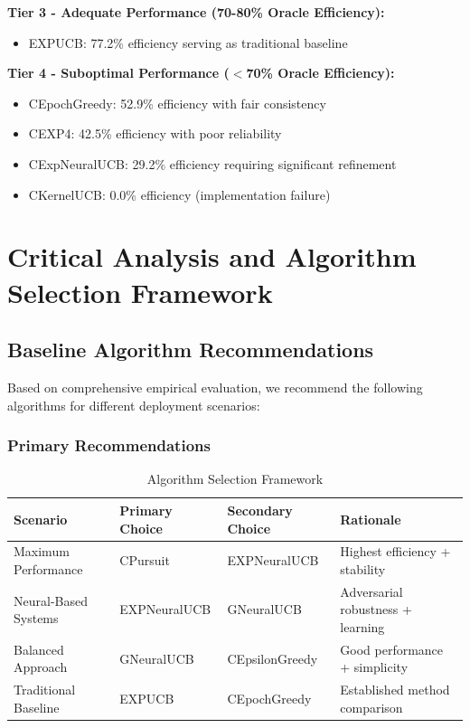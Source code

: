 \documentclass[12pt,a4paper]{article}
\begin{document}
\textbf{Tier 3 - Adequate Performance (70-80\% Oracle Efficiency):}
\begin{itemize}
\item EXPUCB: 77.2\% efficiency serving as traditional baseline
\end{itemize}

\textbf{Tier 4 - Suboptimal Performance ($<$70\% Oracle Efficiency):}
\begin{itemize}
\item CEpochGreedy: 52.9\% efficiency with fair consistency
\item CEXP4: 42.5\% efficiency with poor reliability
\item CExpNeuralUCB: 29.2\% efficiency requiring significant refinement
\item CKernelUCB: 0.0\% efficiency (implementation failure)
\end{itemize}

\newpage
\section{Critical Analysis and Algorithm Selection Framework}

\subsection{Baseline Algorithm Recommendations}

Based on comprehensive empirical evaluation, we recommend the following algorithms for different deployment scenarios:

\subsubsection{Primary Recommendations}

\begin{table}[H]
\centering
\caption{Algorithm Selection Framework}
\begin{tabular}{|l|l|l|l|}
\hline
\textbf{Scenario} & \textbf{Primary Choice} & \textbf{Secondary Choice} & \textbf{Rationale} \\
\hline
\hline
Maximum Performance & CPursuit & EXPNeuralUCB & Highest efficiency + stability \\
Neural-Based Systems & EXPNeuralUCB & GNeuralUCB & Adversarial robustness + learning \\
Balanced Approach & GNeuralUCB & CEpsilonGreedy & Good performance + simplicity \\
Traditional Baseline & EXPUCB & CEpochGreedy & Established method comparison \\
\hline
\end{tabular}
\end{table}
\end{document}
